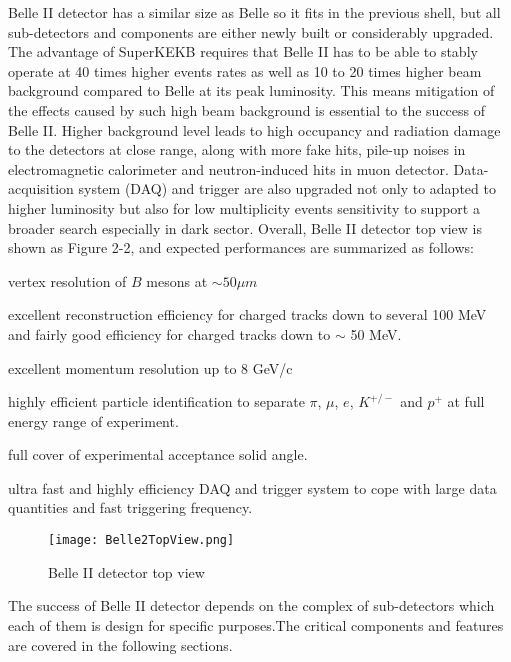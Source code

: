 Belle II detector has a similar size as Belle so it fits in the previous shell, but all sub-detectors and components are either newly built or considerably upgraded. The advantage of SuperKEKB requires that Belle II has to be able to stably operate at 40 times higher events rates as well as 10 to 20 times higher beam background compared to Belle at its peak luminosity. This means mitigation of the effects caused by such high beam background is essential to the success of Belle II. Higher background level leads to high occupancy and radiation damage to the detectors at close range, along with more fake hits, pile-up noises in electromagnetic calorimeter and neutron-induced hits in muon detector. Data-acquisition system (DAQ) and trigger are also upgraded not only to adapted to higher luminosity but also for low multiplicity events sensitivity to support a broader search especially in dark sector. Overall, Belle II detector top view is shown as Figure 2-2, and expected performances are summarized as follows: 

\textbullet \space vertex resolution of $B$ mesons at $\sim 50 \mu m$ 

\textbullet \space excellent reconstruction efficiency for charged tracks down to several 100 MeV and fairly good efficiency for charged tracks down to $\sim$ 50 MeV.

\textbullet \space excellent momentum resolution up to 8 GeV/c

\textbullet \space highly efficient particle identification to separate $\pi$, $\mu$, $e$, $K^{+/-}$ and $p^+$ at full energy range of experiment.  

\textbullet \space full cover of experimental acceptance solid angle. 

\textbullet \space ultra fast and highly efficiency DAQ and trigger system to cope with large data quantities and fast triggering frequency. 

\begin{figure}[htbp]
	\centering 
	\texttt{[image: Belle2TopView.png]}
	\caption{Belle II detector top view}
\end{figure}

The success of Belle II detector depends on the complex of sub-detectors which each of them is design for specific purposes.The critical components and features are covered in the following sections. 


